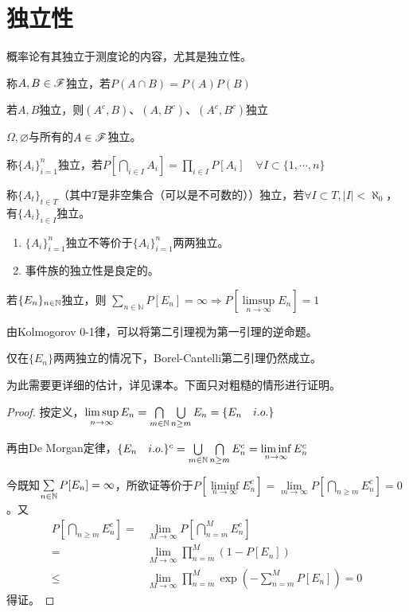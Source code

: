 \documentclass{ctexart}
\begin{document}
\section{独立性}
概率论有其独立于测度论的内容，尤其是独立性。
\begin{Def}[事件的独立性]
  称$A,B\in\mathscr{F}$独立，若$P(A\cap B)=P(A)P(B)$
\end{Def}
\begin{Eg}
  若$A,B$独立，则$(A^{c},B)$、$(A,B^{c})$、$(A^{c},B^{c})$独立
\end{Eg}
\begin{Eg}
  $\Omega,\varnothing$与所有的$A\in \mathscr{F}$独立。
\end{Eg}

\begin{Def}[事件族的独立性]
  称$\{A_{i}\}_{i=1}^{n}$独立，若$P[\bigcap\limits_{i\in I}A_{i}]=\prod_{i\in I}P[A_{i}]\quad\forall I\subset \{1,\cdots,n\}$

  称$\{A_{t}\}_{t\in T}$（其中$T$是非空集合（可以是不可数的））独立，若$\forall I\subset T,|I|<\aleph_{0}$，有$\{A_{i}\}_{i\in I}$独立。
\end{Def}

\begin{Rmk}
  \begin{enumerate}
  \item $\{A_{i}\}_{i=1}^{n}$独立不等价于$\{A_{i}\}_{i=1}^{n}$两两独立。
  \item 事件族的独立性是良定的。
  \end{enumerate}
\end{Rmk}

\begin{Thm}
  若$\{E_{n}\}_{n\in\mathbb{N}}$独立，则
  $\sum\limits_{n\in\mathbb{N}}P[E_{n}]=\infty\Rightarrow P[\limsup\limits_{n\to\infty}E_{n}]=1$
\end{Thm}
由Kolmogorov 0-1律，可以将第二引理视为第一引理的逆命题。

\begin{Rmk}
  仅在$\{E_{n}\}$两两独立的情况下，Borel-Cantelli第二引理仍然成立。
\end{Rmk}
为此需要更详细的估计，详见课本。下面只对粗糙的情形进行证明。

\begin{proof}
  按定义，$\limsup\limits_{n\to\infty}E_{n}=\bigcap\limits_{m\in\mathbb{N}}\bigcup\limits_{n\geq m}E_{n}=\{E_{n}\quad i.o.\}$

  再由De Morgan定律，$\{E_{n}\quad i.o.\}^{c}=\bigcup\limits_{m\in\mathbb{N}}\bigcap\limits_{n\geq m}E_{n}^{c}=\liminf\limits_{n\to\infty}E_{n}^{c}$

  今既知$\sum\limits_{n\in\mathbb{N}}P[E_{n}]=\infty$，所欲证等价于$P[\liminf\limits_{n\to\infty}E_{n}^{c}]=\lim\limits_{m\to\infty}P[\bigcap\limits_{n\geq m}E_{n}^{c}]=0$。又
\begin{align*}
  P[\bigcap\limits_{n\geq m}E_{n}^{c}]=&\lim_{M\to\infty}P[\bigcap_{n=m}^{M}E_{n}^{c}]\\
  =&\lim_{M\to\infty}\prod_{n=m}^{M}(1-P[E_{n}])\\
  \leq&\lim_{M\to\infty}\prod_{n=m}^{M}\exp(-\sum_{n=m}^{M}P[E_{n}])=0
\end{align*}
得证。
\end{proof}
\end{document}
